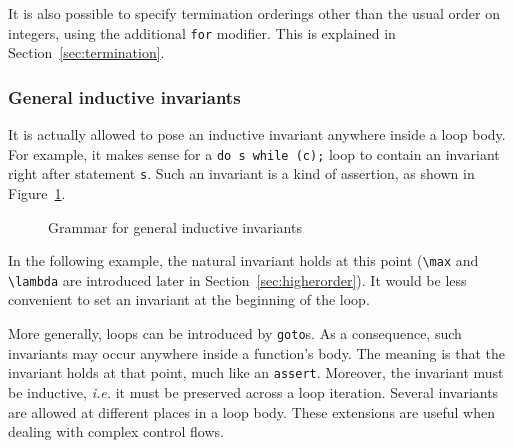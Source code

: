 It is also possible to specify termination orderings other than the
usual order on integers, using the additional \lstinline|for|
modifier. This is explained in Section~\ref{sec:termination}.

\subsubsection{General inductive invariants}
It is actually allowed to pose an inductive invariant
anywhere inside a loop body.
For example, it makes sense for a
\lstinline|do s while (c);| loop to contain an invariant right after statement
\lstinline|s|. Such an invariant is a kind of assertion, as
shown in Figure~\ref{fig:advancedinvariants}.

\begin{figure}[t]
  \begin{cadre}
    
  \end{cadre}
  \caption{Grammar for general inductive invariants}
  \label{fig:advancedinvariants}
\end{figure}

\begin{example}
  In the following example, the natural invariant holds at this point
  (\lstinline!\max! and \lstinline!\lambda! are introduced later in
  Section~\ref{sec:higherorder}).
  It would be less convenient to set an invariant at the beginning
  of the loop.
\end{example}

More generally, loops can be introduced by \lstinline|goto|s.
As a consequence, such invariants may occur anywhere
inside a function's body. The meaning is that the invariant
holds at that point, much like an \lstinline{assert}. Moreover, the
invariant must be inductive, \emph{i.e.} it must be preserved across a
loop iteration. Several invariants are allowed at different places in
a loop body. These extensions are useful when dealing with complex
control flows.


